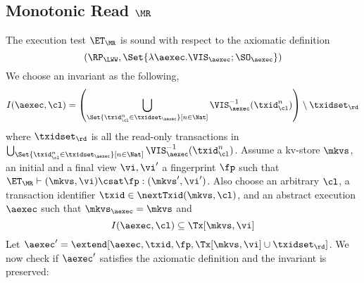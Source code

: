 \subsection{Monotonic Read \( \MR \)}
\label{sec:sound-complete-mr}

The execution test $\ET_\MR$ is sound with respect to the axiomatic definition \cite{surech-session-guarantee}
\[(\RP_{\LWW}, \Set{\lambda \aexec. \VIS_{\aexec} ; \SO_{\aexec} })\] 
We choose an invariant as the following,  
\[
    I(\aexec, \cl) = \left( \bigcup_{\Set{\txid_{\cl}^{n} \in \txidset_{\aexec} }[ n \in \Nat]} \VIS_{\aexec}^{-1}(\txid^n_\cl) \right) \setminus \txidset_\rd
\]
where \( \txidset_\rd \) is all the read-only transactions in 
\( \bigcup_{\Set{\txid_{\cl}^{n} \in \txidset_{\aexec} }[ n \in \Nat]} \VIS_{\aexec}^{-1}(\txid^n_\cl) \).
Assume a kv-store $\mkvs$, an initial and a final view $\vi, \vi'$  a fingerprint $\fp$ 
such that $\ET_{\MR} \vdash (\mkvs, \vi) \csat \fp: (\mkvs',\vi')$. 
Also choose an arbitrary $\cl$, a transaction identifier $\txid \in \nextTxid(\mkvs, \cl)$, 
and an abstract execution $\aexec$ such that $\mkvs_{\aexec} = \mkvs$ and 
\begin{equation}
I(\aexec, \cl) \subseteq \Tx[\mkvs, \vi]
\label{eq:mr_invariant}
\end{equation}
Let \( \aexec' = \extend[\aexec, \txid, \fp, \Tx[\mkvs, \vi] \cup \txidset_\rd] \).
We now check if \( \aexec' \) satisfies the axiomatic definition and the invariant is preserved:
